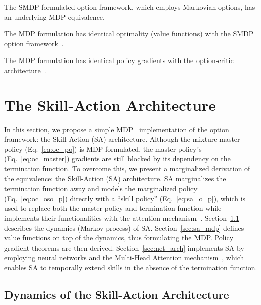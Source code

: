 \begin{thm}
  \label{theo:smdp_mdp}
  The SMDP formulated option framework, which employs Markovian
  options, has an underlying MDP equivalence.
\end{thm}
\begin{prop}
  \label{prop:opt}
  The MDP formulation has identical optimality (value functions)
  with the SMDP option framework~\cite{sutton1999between}.
\end{prop}
\begin{prop}
  \label{prop:pg}
  The MDP formulation has identical policy gradients with the
  option-critic architecture~\cite{bacon2017option}.
\end{prop}

\section{The Skill-Action Architecture}
\label{sec:sa}

In this section, we propose a simple
MDP~\cite{puterman2014markov} implementation of the option
framework: the Skill-Action (SA) architecture. Although the
mixture master policy (Eq.~\ref{eq:oc_po}) is MDP formulated, the
master policy's (Eq.~\ref{eq:oc_master}) gradients are
still blocked by its dependency on the termination function. To
overcome this, we present a marginalized derivation of the
equivalence: the Skill-Action (SA) architecture. SA marginalizes
the termination function away and models the marginalized policy
(Eq.~\ref{eq:oc_oso_p}) directly with a ``skill policy''
(Eq.~\ref{eq:sa_o_p}), which is used to replace both the master
policy and termination function while implements their
functionalities with the attention
mechanism~\cite{vaswani2017attention}. Section~\ref{sec:sa_PGM}
describes the dynamics (Markov process) of SA.
Section~\ref{sec:sa_mdp} defines value functions on top of the
dynamics, thus formulating the MDP. Policy gradient theorems are
then derived. Section~\ref{sec:net_arch} implements SA by
employing neural networks and the Multi-Head Attention
mechanism~\cite{vaswani2017attention}, which enables SA to
temporally extend skills in the absence of the termination
function.


\subsection{Dynamics of the Skill-Action Architecture}
\label{sec:sa_PGM}

